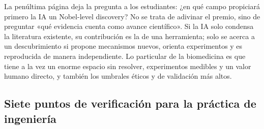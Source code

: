 La penúltima página deja la pregunta a los estudiantes: ¿en qué campo propiciará primero la IA un Nobel-level discovery? No se trata de adivinar el premio, sino de preguntar «qué evidencia cuenta como avance científico». Si la IA solo condensa la literatura existente, su contribución es la de una herramienta; solo se acerca a un descubrimiento si propone mecanismos nuevos, orienta experimentos y es reproducida de manera independiente. Lo particular de la biomedicina es que tiene a la vez un enorme espacio sin resolver, experimentos medibles y un valor humano directo, y también los umbrales éticos y de validación más altos.




\subsection{Siete puntos de verificación para la práctica de ingeniería}

